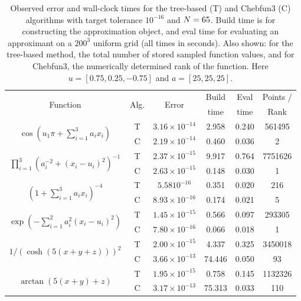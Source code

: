 \begin{table}[p]
  \begin{tabular}{c|c|c|c|c|c}
    \multirow{2}{*}{Function} & \multirow{2}{*}{Alg.} & \multirow{2}{*}{Error} & Build & Eval & Points /  \\
 & &  & time & time &Rank  \\ \hline
    \multirow{2}{*}{$\cos(u_1\pi + \sum_{i=1}^3 a_i x_i)$} & T & $3.16 \times 10^{-14}$ &	2.958 &	0.240 &	561495 \Tstrut\\
    & C & $2.19 \times 10^{-14}$ 	& 0.460 &	0.036 &	2 \\ \hline
    \multirow{2}{*}{$\prod_{i=1}^3 (a_i^{-2}+(x_i-u_i)^2)^{-1}$} & T & $2.37 \times 10^{-15}$ 	& 9.917 & 0.764 & 7751626 \Tstrut\\
    & C & $2.63 \times 10^{-15}$	 &  0.148 &	0.030 &	1 \\ \hline
    \multirow{2}{*}{$(1+\sum_{i=1}^3 a_i x_i)^{-4}$} & T & $5.58 10^{-16}$ & 0.351 &	0.020 &	216 \Tstrut\\
    & C & $8.93 \times 10^{-16}$ &	0.174 &	0.021 & 5\\ \hline
    \multirow{2}{*}{$\exp(-\sum_{i=1}^2 a_i^2 (x_i-u_i)^2)$} & T & $1.45\times 10^{-15}$ &	0.566 &	0.097 &	293305 \Tstrut  \\
    & C & $7.80 \times 10^{-16}$ &	0.066 &	0.018 & 1 \\ \hline
    \multirow{2}{*}{$1/(\cosh(5(x+y+z)))^2$} & T & $2.00\times 10^{-15}$	 & 4.337	 & 0.325 &	3450018 \Tstrut\\
    & C & $3.66 \times 10^{-13}$ 	& 74.446	 &0.050 &	93 \\ \hline
    \multirow{2}{*}{$\arctan(5(x+y)+z)$} & T & $1.95 \times 10^{-15}$ &	0.758	& 0.145	& 1132326 \Tstrut\\
    & C & $3.17\times 10^{-13}$	& 75.313	 & 0.033	& 110
  \end{tabular}
  \caption{Observed error and wall-clock times for the tree-based (T) and Chebfun3 (C) algorithms with target tolerance $10^{-16}$ and $N=65$. Build time is for constructing the approximation object, and eval time for evaluating an approximant on a $200^3$ uniform grid (all times in seconds). Also shown: for the tree-based method, the total number of stored sampled function values, and for Chebfun3, the numerically determined rank of the function. Here $u=[0.75,0.25,-0.75]$ and $a=[25,25,25]$.} 
  \label{tab:timing3D}
\end{table}


